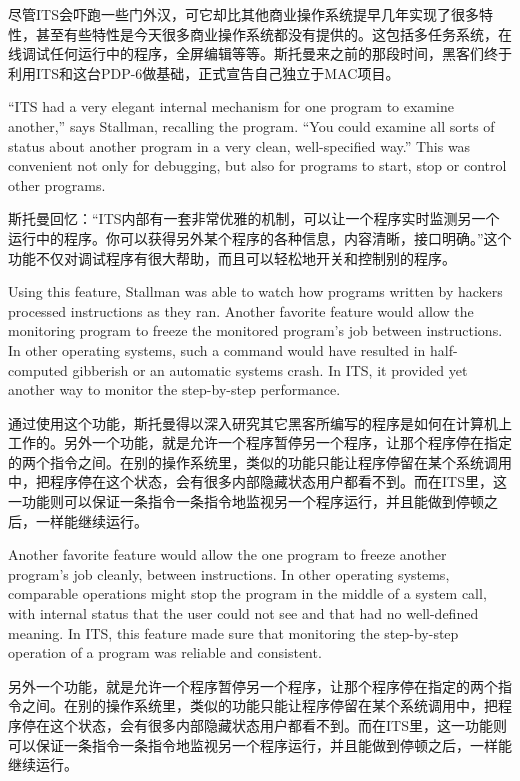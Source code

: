 \ifdefined\chs
尽管ITS会吓跑一些门外汉，可它却比其他商业操作系统提早几年实现了很多特性，甚至有些特性是今天很多商业操作系统都没有提供的。这包括多任务系统，在线调试任何运行中的程序，全屏编辑等等。斯托曼来之前的那段时间，黑客们终于利用ITS和这台PDP-6做基础，正式宣告自己独立于MAC项目\fi{}。
\fi
\fi

\ifdefined\eng
``ITS had a very elegant internal mechanism for one program to examine another,'' says Stallman, recalling the program. ``You could examine all sorts of status about another program in a very clean, well-specified way.'' \ifdefined\vtwo This was convenient not only for debugging, but also for programs to start, stop or control other programs.\fi
\fi

\ifdefined\chs
斯托曼回忆：``ITS内部有一套非常优雅的机制，可以让一个程序实时监测另一个运行中的程序。你可以获得另外某个程序的各种信息，内容清晰，接口明确。''\ifdefined\vtwo 这个功能不仅对调试程序有很大帮助，而且可以轻松地开关和控制别的程序。\fi
\fi


\ifdefined\vone
\ifdefined\eng
Using this feature, Stallman was able to watch how programs written by hackers processed instructions as they ran. Another favorite feature would allow the monitoring program to freeze the monitored program's job between instructions. In other operating systems, such a command would have resulted in half-computed gibberish or an automatic systems crash. In ITS, it provided yet another way to monitor the step-by-step performance.
\fi

\ifdefined\chs
通过使用这个功能，斯托曼得以深入研究其它黑客所编写的程序是如何在计算机上工作的。另外一个功能，就是允许一个程序暂停另一个程序，让那个程序停在指定的两个指令之间。在别的操作系统里，类似的功能只能让程序停留在某个系统调用中，把程序停在这个状态，会有很多内部隐藏状态用户都看不到。而在ITS里，这一功能则可以保证一条指令一条指令地监视另一个程序运行，并且能做到停顿之后，一样能继续运行。
\fi
\fi

\ifdefined\vtwo
\ifdefined\eng
Another favorite feature would allow the one program to freeze another program's job cleanly, between instructions. In other operating systems, comparable operations might stop the program in the middle of a system call, with internal status that the user could not see and that had no well-defined meaning. In ITS, this feature made sure that monitoring the step-by-step operation of a program was reliable and consistent.
\fi

\ifdefined\chs
另外一个功能，就是允许一个程序暂停另一个程序，让那个程序停在指定的两个指令之间。在别的操作系统里，类似的功能只能让程序停留在某个系统调用中，把程序停在这个状态，会有很多内部隐藏状态用户都看不到。而在ITS里，这一功能则可以保证一条指令一条指令地监视另一个程序运行，并且能做到停顿之后，一样能继续运行。
\fi
\fi

